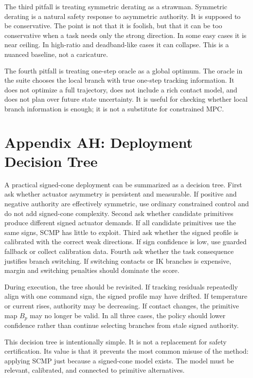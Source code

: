 \documentclass{article}
\begin{document}
The third pitfall is treating symmetric derating as a strawman. Symmetric derating is a natural safety response to asymmetric authority. It is supposed to be conservative. The point is not that it is foolish, but that it can be too conservative when a task needs only the strong direction. In some easy cases it is near ceiling. In high-ratio and deadband-like cases it can collapse. This is a nuanced baseline, not a caricature.

The fourth pitfall is treating one-step oracle as a global optimum. The oracle in the suite chooses the local branch with true one-step tracking information. It does not optimize a full trajectory, does not include a rich contact model, and does not plan over future state uncertainty. It is useful for checking whether local branch information is enough; it is not a substitute for constrained MPC.

\section*{Appendix AH: Deployment Decision Tree}

A practical signed-cone deployment can be summarized as a decision tree. First ask whether actuator asymmetry is persistent and measurable. If positive and negative authority are effectively symmetric, use ordinary constrained control and do not add signed-cone complexity. Second ask whether candidate primitives produce different signed actuator demands. If all candidate primitives use the same signs, SCMP has little to exploit. Third ask whether the signed profile is calibrated with the correct weak directions. If sign confidence is low, use guarded fallback or collect calibration data. Fourth ask whether the task consequence justifies branch switching. If switching contacts or IK branches is expensive, margin and switching penalties should dominate the score.

During execution, the tree should be revisited. If tracking residuals repeatedly align with one command sign, the signed profile may have drifted. If temperature or current rises, authority may be decreasing. If contact changes, the primitive map $B_p$ may no longer be valid. In all three cases, the policy should lower confidence rather than continue selecting branches from stale signed authority.

This decision tree is intentionally simple. It is not a replacement for safety certification. Its value is that it prevents the most common misuse of the method: applying SCMP just because a signed-cone model exists. The model must be relevant, calibrated, and connected to primitive alternatives.
\end{document}
